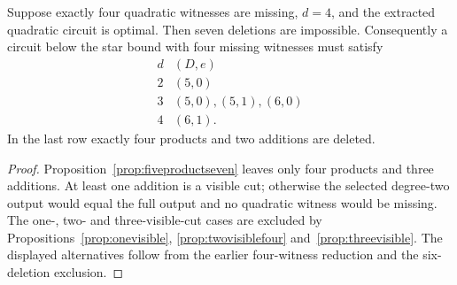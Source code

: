 \begin{theorem}\label{thm:sevendeletion}
Suppose exactly four quadratic witnesses are missing, $d=4$, and the extracted quadratic circuit is optimal. Then seven deletions are impossible. Consequently a circuit below the star bound with four missing witnesses must satisfy
\[
\begin{array}{c|l}
d&(D,e)\\\hline
2&(5,0)\\
3&(5,0),(5,1),(6,0)\\
4&(6,1).
\end{array}
\]
In the last row exactly four products and two additions are deleted.
\end{theorem}
\begin{proof}
Proposition~\ref{prop:fiveproductseven} leaves only four products and three additions. At least one addition is a visible cut; otherwise the selected degree-two output would equal the full output and no quadratic witness would be missing. The one-, two- and three-visible-cut cases are excluded by Propositions~\ref{prop:onevisible}, \ref{prop:twovisiblefour} and~\ref{prop:threevisible}. The displayed alternatives follow from the earlier four-witness reduction and the six-deletion exclusion.
\end{proof}
